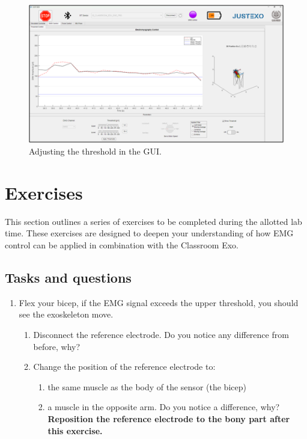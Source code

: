\begin{figure}[H]
	\centering
	\includegraphics[width=0.7\linewidth]{img/fig_20}
	\caption{Adjusting the threshold in the GUI.}
	\label{fig:fig20}
\end{figure}

\newpage
\section{Exercises}
This section outlines a series of exercises to be completed during the allotted lab time. These exercises are designed to deepen your understanding of how EMG control can be applied in combination with the Classroom Exo. 

\subsection{Tasks and questions}

\begin{enumerate}[]
	\item Flex your bicep, if the EMG signal exceeds the upper threshold, you should see the exoskeleton move.  
	\begin{enumerate}[]
		\item Disconnect the reference electrode. Do you notice any difference from before, why? 
		\item Change the position of the reference electrode to: 
		\begin{enumerate}[]
			\item the same muscle as the body of the sensor (the bicep)
			\item a muscle in the opposite arm. Do you notice a difference, why? 
			\textbf{Reposition the reference electrode to the bony part after this exercise.}
		\end{enumerate}
	\end{enumerate}
\end{enumerate}
 
